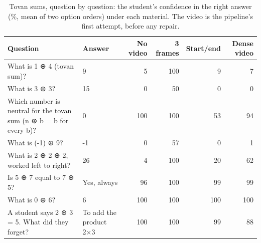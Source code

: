 \begin{table}[t]\centering\footnotesize
\caption{Tovan sums, question by question: the student's confidence in the right answer (\%, mean of two option orders) under each material. The video is the pipeline's first attempt, before any repair.}\label{tab:novel_items}
\begin{tabular}{p{6.4cm}p{2.4cm}rrrr}\toprule Question & Answer & No video & 3 frames & Start/end & Dense video\\\midrule
What is 1 ⊕ 4 (tovan sum)? & 9 & 5 & 100 & 9 & 7 \\
What is 3 ⊕ 3? & 15 & 0 & 50 & 0 & 0 \\
Which number is neutral for the tovan sum (n ⊕ b = b for every b)? & 0 & 100 & 100 & 53 & 94 \\
What is (-1) ⊕ 9? & -1 & 0 & 57 & 0 & 1 \\
What is 2 ⊕ 2 ⊕ 2, worked left to right? & 26 & 4 & 100 & 20 & 62 \\
Is 5 ⊕ 7 equal to 7 ⊕ 5? & Yes, always & 96 & 100 & 99 & 99 \\
What is 0 ⊕ 6? & 6 & 100 & 100 & 100 & 100 \\
A student says 2 ⊕ 3 = 5. What did they forget? & To add the product 2×3 & 100 & 100 & 99 & 88 \\
\bottomrule\end{tabular}
\end{table}
